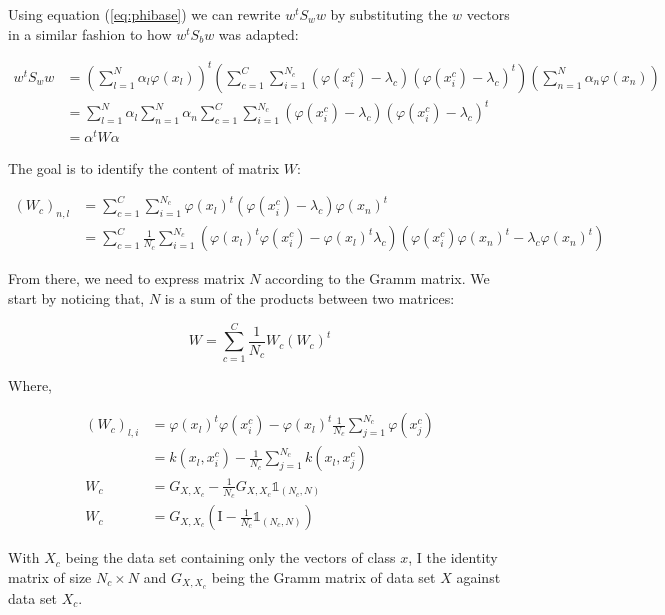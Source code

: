 Using equation (\ref{eq:phibase}) we can rewrite $w^tS_ww$ by substituting the $w$ vectors in a similar fashion
to how $w^tS_bw$ was adapted:

\begin{align*}
  w^tS_ww &= \left( \sum_{l=1}^N \alpha_l \varphi(x_l)\right)^t
             \left( \sum_{c=1}^C \sum_{i=1}^{N_c} (\varphi(x_i^c) - \lambda_c) (\varphi(x_i^c) - \lambda_c)^t\right) \left( \sum_{n=1}^N \alpha_n \varphi(x_n)\right) \\
          &= \sum_{l=1}^N \alpha_l \sum_{n=1}^N \alpha_n \sum_{c=1}^C                 \sum_{i=1}^{N_c} (\varphi(x_i^c) - \lambda_c)
                                 (\varphi(x_i^c) - \lambda_c)^t \\
&= \alpha^tW\alpha
\end{align*}


The goal is to identify the content of matrix $W$:

\begin{align*}
  (W_c)_{n,l} &= \sum_{c=1}^C \sum_{i=1}^{N_c}
                  \varphi(x_l)^t(\varphi(x_i^c) - \lambda_c)\varphi(x_n)^t \\
            &= \sum_{c=1}^C \frac{1}{N_c} \sum_{i=1}^{N_c} (\varphi(x_l)^t\varphi(x_i^c) -
            \varphi(x_l)^t\lambda_c) (\varphi(x_i^c)\varphi(x_n)^t -
            \lambda_c \varphi(x_n)^t)
\end{align*}

From there, we need to express matrix $N$ according to the Gramm matrix. We start by noticing that,
$N$ is a sum of the products between two matrices:

\begin{equation*}
W = \sum_{c=1}^C \frac{1}{N_c} W_c (W_c)^t
\end{equation*}

Where,

\begin{align*}
  (W_c)_{l, i} &= \varphi(x_l)^t\varphi(x_i^c) - \varphi(x_l)^t \frac{1}{N_c}\sum_{j=1}^{N_c}\varphi(x_j^c) \\
             &= k(x_l, x_i^c) - \frac{1}{N_c}\sum_{j=1}^{N_c}k(x_l, x_j^c) \\
   W_c       &= G_{X, X_c} - \frac{1}{N_c} G_{X, X_c} \mathds{1}_{(N_c, N)} \\
   W_c       &= G_{X, X_c} \left(\textrm{I} - \frac{1}{N_c}\mathds{1}_{(N_c, N)}\right)
\end{align*}

With $X_c$ being the data set containing only the vectors of class $x$, $\textrm{I}$ the identity matrix of
size $N_c \times N$ and
$G_{X, X_c}$ being the Gramm matrix of data set $X$ against data set $X_c$.

